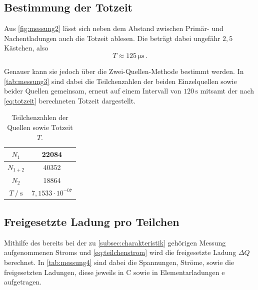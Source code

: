 \subsection{Bestimmung der Totzeit}

Aus \autoref{fig:messung2} lässt sich neben dem Abstand zwischen Primär- und Nachentladungen auch die Totzeit ablesen.
Die beträgt dabei ungefähr $2,5$ Kästchen, also
\begin{equation*}
    T \approx 125 \,\unit{\micro\second} \,.
\end{equation*}

Genauer kann sie jedoch über die Zwei-Quellen-Methode bestimmt werden.
In \autoref{tab:messung3} sind dabei die Teilchenzahlen der beiden Einzelquellen sowie beider Quellen gemeinsam, erneut auf einem Intervall von $120 \,\unit{\second}$ mitsamt der nach \eqref{eq:totzeit} berechneten Totzeit dargestellt.

\begin{table}[H] %
    \centering
    \caption{Teilchenzahlen der Quellen sowie Totzeit $T$.}
    \label{tab:messung3}
    \begin{tabular}{|S | S|}
      \hline
        {$N_1$}                             &  22084    \\
        \hline
        {$N_{1 + 2}$ }                      &  40352    \\
        \hline
        {$N_2$}                             &  18864    \\
        \hline
        {$T \mathbin{/} \unit{\second}$}    &  {$7,1533 \cdot 10^{-07}$} \\
    \hline
    \end{tabular}
\end{table}


\subsection{Freigesetzte Ladung pro Teilchen}
\label{subsec:ladung}

Mithilfe des bereits bei der zu \autoref{subsec:charakteristik} gehörigen Messung aufgenommenen Stroms und \eqref{eq:teilchenstrom} wird die freigesetzte Ladung $\Delta Q$ berechnet.
In \autoref{tab:messung4} sind dabei die Spannungen, Ströme, sowie die freigesetzten Ladungen, diese jeweils in $\unit{\coulomb}$ sowie in Elementarladungen $\text{e}$ aufgetragen.

